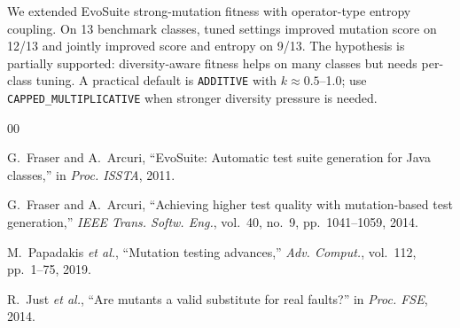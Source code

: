 \documentclass{IEEEtran}
\begin{document}
We extended EvoSuite strong-mutation fitness with operator-type entropy coupling.
On 13 benchmark classes, tuned settings improved mutation score on 12/13 and jointly improved score and entropy on 9/13.
The hypothesis is partially supported: diversity-aware fitness helps on many classes but needs per-class tuning.
A practical default is \texttt{ADDITIVE} with $k \approx 0.5$--1.0; use \texttt{CAPPED\_MULTIPLICATIVE} when stronger diversity pressure is needed.

\balance
\begin{thebibliography}{00}

G.~Fraser and A.~Arcuri, ``EvoSuite: Automatic test suite generation for Java classes,'' in \emph{Proc. ISSTA}, 2011.

G.~Fraser and A.~Arcuri, ``Achieving higher test quality with mutation-based test generation,'' \emph{IEEE Trans. Softw. Eng.}, vol.~40, no.~9, pp.~1041--1059, 2014.

M.~Papadakis \emph{et al.}, ``Mutation testing advances,'' \emph{Adv. Comput.}, vol.~112, pp.~1--75, 2019.

R.~Just \emph{et al.}, ``Are mutants a valid substitute for real faults?'' in \emph{Proc. FSE}, 2014.

\end{thebibliography}
\end{document}
